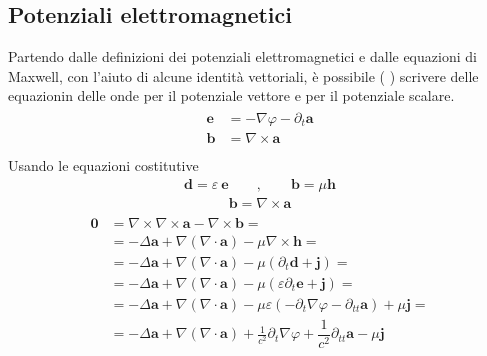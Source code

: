 \documentclass[letterpaper,10pt,italian]{jupyterBook}
\begin{document}
\subsection{Potenziali elettromagnetici}
\label{\detokenize{ch/waves-equation:potenziali-elettromagnetici}}
\sphinxAtStartPar
Partendo dalle definizioni dei potenziali elettromagnetici e dalle equazioni di Maxwell, con l’aiuto di alcune identità vettoriali, è possibile ( ) scrivere delle equazionin delle onde per il potenziale vettore e per il potenziale scalare.
\begin{equation*}
\begin{split}\begin{aligned}
 \mathbf{e} & = - \nabla \varphi - \partial_t \mathbf{a} \\
 \mathbf{b} & = \nabla \times \mathbf{a} \\
\end{aligned}\end{split}
\end{equation*}
\sphinxAtStartPar
Usando le equazioni costitutive
\begin{equation*}
\begin{split}\mathbf{d} = \varepsilon \ \mathbf{e} \qquad , \qquad
\mathbf{b} = \mu \mathbf{h} \end{split}
\end{equation*}
\sphinxAtStartPar
{}
\begin{equation*}
\begin{split}\mathbf{b} = \nabla \times \mathbf{a}\end{split}
\end{equation*}\begin{equation*}
\begin{split}\begin{aligned}
\mathbf{0} & = \nabla \times \nabla \times \mathbf{a} - \nabla \times \mathbf{b} = \\
 & = - \Delta \mathbf{a} + \nabla(\nabla \cdot \mathbf{a})  - \mu \nabla \times \mathbf{h} = \\
 & = - \Delta \mathbf{a} + \nabla(\nabla \cdot \mathbf{a})  - \mu ( \partial_t \mathbf{d} + \mathbf{j} )  = \\
 & = - \Delta \mathbf{a} + \nabla(\nabla \cdot \mathbf{a})  - \mu ( \varepsilon \partial_t \mathbf{e} + \mathbf{j} )  = \\
 & = - \Delta \mathbf{a} + \nabla(\nabla \cdot \mathbf{a})  - \mu \varepsilon ( - \partial_t \nabla \varphi - \partial_{tt} \mathbf{a} ) + \mu \mathbf{j} = \\
 & = - \Delta \mathbf{a} + \nabla(\nabla \cdot \mathbf{a})  + \frac{1}{c^2} \partial_t \nabla \varphi + \dfrac{1}{c^2} \partial_{tt} \mathbf{a} - \mu \mathbf{j}  \\
\end{aligned}\end{split}
\end{equation*}
\end{document}
